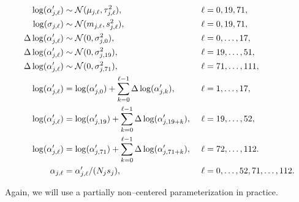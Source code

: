 \begin{footnotesize}
	\begin{align}
	\log(\alpha^\prime_{j,\ell}) &\sim \mcN(\mu_{j,\ell},\tau_{j,\ell}^2),&\ &\ell= 0,19,71, \nonumber\\
	\log(\sigma_{j,\ell}) &\sim \mcN(m_{j,\ell}, s_{j,\ell}^2),&\ &\ell=0,19,71, \nonumber\\
	\Delta\log(\alpha^\prime_{j,\ell})&\sim \mcN(0, \sigma^2_{j,0}),&\ &\ell=0,\dots,17, \nonumber\\
	\Delta\log(\alpha^\prime_{j,\ell})&\sim \mcN(0, \sigma^2_{j,19}),&\ &\ell=19,\dots,51, \nonumber\\
	\Delta\log(\alpha^\prime_{j,\ell})&\sim \mcN(0, \sigma^2_{j,71}),&\ &\ell=71,\dots,111, \nonumber\\
	\log(\alpha^\prime_{j,\ell}) &= \log(\alpha^\prime_{j,0}) + \sum_{k=0}^{\ell-1}\Delta\log(\alpha^\prime_{j,k}),&\ &\ell = 1,\dots,17, \nonumber\\
	\log(\alpha^\prime_{j,\ell}) &= \log(\alpha^\prime_{j,19}) + \sum_{k=0}^{\ell-1}\Delta\log(\alpha^\prime_{j,19+k}),&\ &\ell = 19,\dots,52, \nonumber\\
	\log(\alpha^\prime_{j,\ell}) &= \log(\alpha^\prime_{j,71}) + \sum_{k=0}^{\ell-1}\Delta\log(\alpha^\prime_{j,71+k}),&\ &\ell = 72,\dots,112. \nonumber \\
	\alpha_{j,\ell} &= \alpha^\prime_{j,\ell}/(N_js_j),&\ &\ell=0,\dots,52,71,\dots,112. \nonumber
	\end{align}
\end{footnotesize}
Again, we will use a partially non--centered parameterization in practice.
